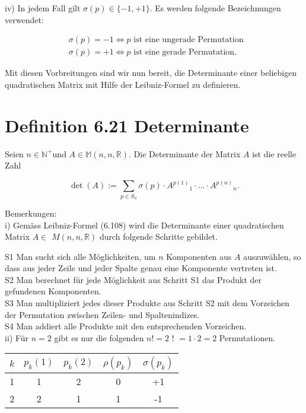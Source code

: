 \documentclass[10pt]{article}
\begin{document}
iv) In jedem Fall gilt $\sigma(p) \in\{-1,+1\}$. Es werden folgende Bezeichnungen verwendet:


\begin{align*}
& \sigma(p)=-1 \Leftrightarrow p \text { ist eine ungerade Permutation }  \tag{6.107}\\
& \sigma(p)=+1 \Leftrightarrow p \text { ist eine gerade Permutation. }
\end{align*}


Mit diesen Vorbreitungen sind wir nun bereit, die Determinante einer beliebigen quadratischen Matrix mit Hilfe der Leibniz-Formel zu definieren.

\section*{Definition 6.21 Determinante}
Seien $n \in \mathbb{N}^{+}$und $A \in \mathbb{M}(n, n, \mathbb{R})$. Die Determinante der Matrix $A$ ist die reelle Zahl


\begin{equation*}
\operatorname{det}(A):=\sum_{p \in S_{n}} \sigma(p) \cdot A^{p(1)}{ }_{1} \cdot \ldots \cdot A^{p(n)}{ }_{n} . \tag{6.108}
\end{equation*}


Bemerkungen:\\
i) Gemäss Leibniz-Formel (6.108) wird die Determinante einer quadratischen Matrix $A \in$ $M(n, n, \mathbb{R})$ durch folgende Schritte gebildet.

S1 Man sucht sich alle Möglichkeiten, um $n$ Komponenten aus $A$ auszuwählen, so dass aus jeder Zeile und jeder Spalte genau eine Komponente vertreten ist.\\
S2 Man berechnet für jede Möglichkeit aus Schritt S1 das Produkt der gefundenen Komponenten.\\
S3 Man multipliziert jedes dieser Produkte aus Schritt S2 mit dem Vorzeichen der Permutation zwischen Zeilen- und Spaltenindizes.\\
S4 Man addiert alle Produkte mit den entsprechenden Vorzeichen.\\
ii) Für $n=2$ gibt es nur die folgenden $n!=2$ ! $=1 \cdot 2=2$ Permutationen.

\begin{center}
\begin{tabular}{|c|cc|cc|}
\hline
$k$ & $p_{k}(1)$ & $p_{k}(2)$ & $\rho\left(p_{k}\right)$ & $\sigma\left(p_{k}\right)$ \\
\hline\hline
1 & 1 & 2 & 0 & +1 \\
2 & 2 & 1 & 1 & -1 \\
\hline
\end{tabular}
\end{center}
\end{document}
